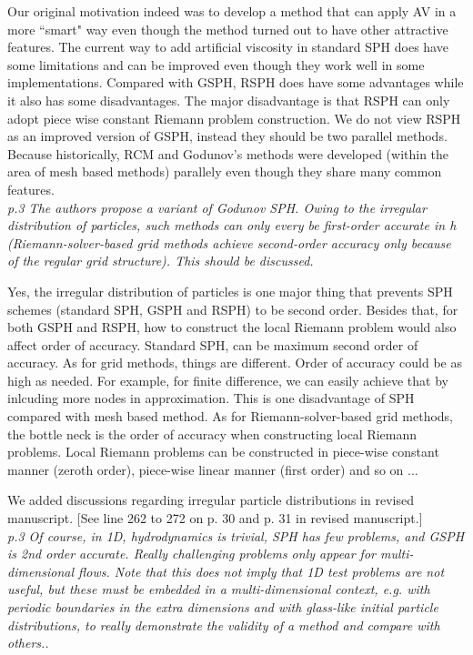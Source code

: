 \documentclass[10pt,a4paper]{article}
\begin{document}
Our original motivation indeed was to develop a method that can apply AV in a more ``smart" way even though the method turned out to have other attractive features.
The current way to add artificial viscosity in standard SPH does have some limitations and can be improved even though they work well in some implementations.
Compared with GSPH, RSPH does have some advantages while it also has some disadvantages. The major disadvantage is that RSPH can only adopt piece wise constant Riemann problem construction.
We do not view RSPH as an improved version of GSPH, instead they should be two parallel methods. Because historically, RCM and Godunov's methods were developed (within the area of mesh based methods) parallely even though they share many common features.
\\[3pt]

\textit{p.3 The authors propose a variant of Godunov SPH. Owing to the irregular distribution of particles, such methods can only every be first-order accurate in h (Riemann-solver-based grid methods achieve second-order accuracy only because of the regular grid structure). This should be discussed.}

Yes, the irregular distribution of particles is one  major thing that prevents SPH schemes (standard SPH, GSPH and RSPH) to be second order. Besides that, for both GSPH and RSPH, how to construct the local Riemann problem would also affect order of accuracy.
Standard SPH, can be maximum second order of accuracy. As for grid methods, things are different. Order of accuracy could be as high as needed. For example, for finite difference, we can easily achieve that by inlcuding more nodes in approximation. This is one disadvantage of SPH compared with mesh based method. As for Riemann-solver-based grid methods, the bottle neck is the order of accuracy when constructing local Riemann problems. Local Riemann problems can be constructed in piece-wise constant manner (zeroth order), piece-wise linear manner (first order) and so on ...

We added discussions regarding irregular particle distributions in revised manuscript. [See line 262 to 272 on p. 30 and p. 31 in revised manuscript.]
\\[3pt]

\textit{p.3 Of course, in 1D, hydrodynamics is trivial, SPH has few problems, and
GSPH is 2nd order accurate. Really challenging problems only appear for multi-dimensional flows. Note that this does not imply that 1D test
problems are not useful, but these must be embedded in a multi-dimensional context, e.g. with periodic boundaries in the extra dimensions and with glass-like initial particle distributions, to really
demonstrate the validity of a method and compare with others..}
\end{document}
